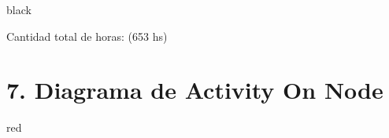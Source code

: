 \documentclass[11pt]{charter}
\begin{document}
\begin{consigna}{black}
\begin{enumerate}
\end{enumerate}

Cantidad total de horas: (653 hs)


\end{consigna}

\section{7. Diagrama de Activity On Node}
\label{sec:AoN}

\begin{consigna}{red}



\end{consigna}
\end{document}
